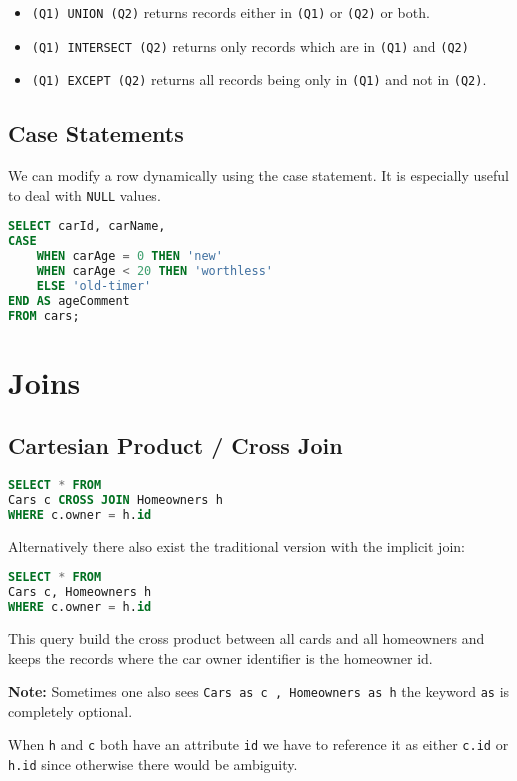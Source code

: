 \documentclass{sciposter}
\renewcommand{\t}[1]{\texttt{#1}}
\begin{document}
\begin{multicols}{3}
\begin{itemize}
	\item \t{(Q1) UNION (Q2)} returns records either in \t{(Q1)} or \t{(Q2)} or both.
	\item \t{(Q1) INTERSECT (Q2)} returns only records which are in \t{(Q1)} and \t{(Q2)}
	\item \t{(Q1) EXCEPT (Q2)} returns all records being only in \t{(Q1)} and not in \t{(Q2)}.
\end{itemize}


\subsection*{Case Statements}
We can modify a row dynamically using the case statement. It is especially useful to deal with \t{NULL} values.
\begin{lstlisting}[language=SQL]
SELECT carId, carName,
CASE
	WHEN carAge = 0 THEN 'new'
	WHEN carAge < 20 THEN 'worthless'
	ELSE 'old-timer'
END AS ageComment
FROM cars; 
\end{lstlisting}

\section*{Joins}

\subsection*{Cartesian Product / Cross Join}

\begin{lstlisting}[language=SQL]
SELECT * FROM 
Cars c CROSS JOIN Homeowners h
WHERE c.owner = h.id
\end{lstlisting}

Alternatively there also exist the traditional version with the implicit join:

\begin{lstlisting}[language=SQL]
SELECT * FROM 
Cars c, Homeowners h
WHERE c.owner = h.id
\end{lstlisting}

This query build the cross product between all cards and all homeowners and keeps the records where the car owner identifier is the homeowner id.

\textbf{Note:} Sometimes one also sees \t{Cars as c , Homeowners as h} the keyword \t{as} is completely optional.


When \t{h} and \t{c} both have an attribute \t{id} we have to reference it as either \t{c.id} or \t{h.id} since otherwise there would be ambiguity.


\end{multicols}
\end{document}
